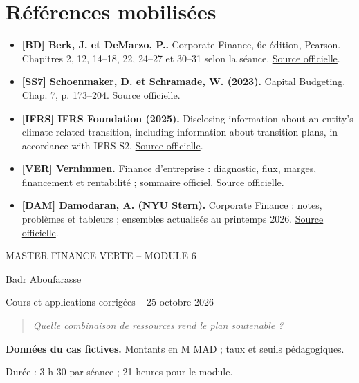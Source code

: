 \documentclass[12pt,a4paper]{article}
\begin{document}
\section*{Références mobilisées}
\small
\begin{itemize}
\item \textbf{[BD] Berk, J. et DeMarzo, P..} Corporate Finance, 6e édition, Pearson. Chapitres 2, 12, 14--18, 22, 24--27 et 30--31 selon la séance. \href{https://www.pearson.com/en-us/subject-catalog/p/corporate-finance/P200000009791/9780137844906}{Source officielle}.
\item \textbf{[SS7] Schoenmaker, D. et Schramade, W. (2023).} Capital Budgeting. Chap. 7, p. 173--204. \href{https://doi.org/10.1007/978-3-031-35009-2_7}{Source officielle}.
\item \textbf{[IFRS] IFRS Foundation (2025).} Disclosing information about an entity’s climate-related transition, including information about transition plans, in accordance with IFRS S2. \href{https://www.ifrs.org/content/dam/ifrs/supporting-implementation/ifrs-s2/transition-plan-disclosure-s2.pdf}{Source officielle}.
\item \textbf{[VER] Vernimmen.} Finance d’entreprise : diagnostic, flux, marges, financement et rentabilité ; sommaire officiel. \href{https://www.vernimmen.fr/Vernimmen/Plan_du_livre.php}{Source officielle}.
\item \textbf{[DAM] Damodaran, A. (NYU Stern).} Corporate Finance : notes, problèmes et tableurs ; ensembles actualisés au printemps 2026. \href{https://pages.stern.nyu.edu/~adamodar/New_Home_Page/cflect.htm}{Source officielle}.
\end{itemize}\normalsize
\clearpage
\begin{center}{\small MASTER FINANCE VERTE -- MODULE 6}\par\vspace{8pt}{\Large\bfseries Séance 3 -- Structure du capital et choix de financement}\par\vspace{6pt}Badr Aboufarasse\par{\small Cours et applications corrigées -- 25 octobre 2026}\end{center}
\begin{quote}\itshape Quelle combinaison de ressources rend le plan soutenable ?\end{quote}
\textbf{Données du cas fictives.} Montants en M MAD ; taux et seuils pédagogiques.\par Durée : 3 h 30 par séance ; 21 heures pour le module.
\end{document}

